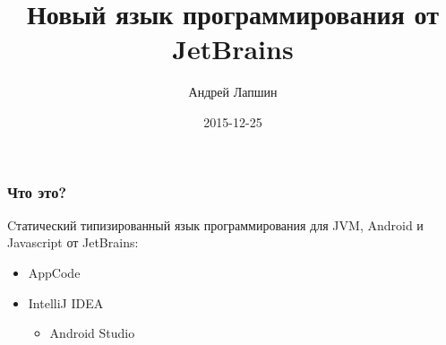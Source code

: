 \documentclass{beamer}
\author{Андрей Лапшин}
\date{2015-12-25}
\title{Новый язык программирования от JetBrains}
\begin{document}
\begin{frame}
    \titlepage
\end{frame}

\begin{frame}
    \frametitle{Что это?}
    Cтатический типизированный язык программирования для JVM, Android
    и Javascript от JetBrains:
    \begin{itemize}
        \item AppCode
        \item IntelliJ IDEA
            \begin{itemize}
                \item Android Studio
            \end{itemize}
    \end{itemize}
\end{frame}
\end{document}
